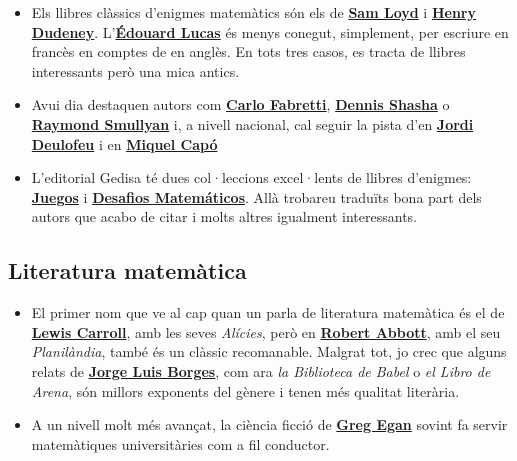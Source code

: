 \documentclass[a4paper, 12pt]{article}
\begin{document}
            \begin{itemize}
                \item Els llibres clàssics d'enigmes matemàtics són els de \href{https://ca.wikipedia.org/wiki/Sam_Loyd}{\textbf{Sam Loyd}} i \href{https://ca.wikipedia.org/wiki/Henry_Dudeney}{\textbf{Henry Dudeney}}. L'\href{https://ca.wikipedia.org/wiki/\%C3\%89douard_Lucas}{\textbf{Édouard Lucas}} és menys conegut, simplement, per escriure en francès en comptes de en anglès. En tots tres casos, es tracta de llibres interessants però una mica antics.
                \item Avui dia destaquen autors com \href{https://es.wikipedia.org/wiki/Carlo_Frabetti}{\textbf{Carlo Fabretti}}, \href{https://en.wikipedia.org/wiki/Dennis_Shasha}{\textbf{Dennis Shasha}} o \href{https://ca.wikipedia.org/wiki/Raymond_Smullyan}{\textbf{Raymond Smullyan}} i, a nivell nacional, cal seguir la pista d'en \href{https://gedisa.com/autor.aspx?codaut=1298}{\textbf{Jordi Deulofeu}} i en \href{https://www.casadellibro.com/libros-ebooks/miquel-capo-dolz/128544}{\textbf{Miquel Capó}}
                \item L'editorial Gedisa té dues col·leccions excel·lents de llibres d'enigmes: \href{https://www.gedisa.com/articulos.aspx?modo=c&fam=040}{\textbf{Juegos}} i \href{https://www.gedisa.com/articulos.aspx?modo=c&fam=1024}{\textbf{Desafios Matemáticos}}. Allà trobareu traduïts bona part dels autors que acabo de citar i molts altres igualment interessants.
            \end{itemize}

        \subsection*{Literatura matemàtica}

            \begin{itemize}
                \item El primer nom que ve al cap quan un parla de literatura matemàtica és el de \href{https://ca.wikipedia.org/wiki/Lewis_Carroll}{\textbf{Lewis Carroll}}, amb les seves \emph{Alícies}, però en \href{https://ca.wikipedia.org/wiki/Edwin_Abbott_Abbott}{\textbf{Robert Abbott}}, amb el seu \emph{Planilàndia}, també és un clàssic recomanable. Malgrat tot, jo crec que alguns relats de \href{https://ca.wikipedia.org/wiki/Jorge_Luis_Borges}{\textbf{Jorge Luis Borges}}, com ara \emph{la Biblioteca de Babel} o \emph{el Libro de Arena}, són millors exponents del gènere i tenen més qualitat literària.
                \item A un nivell molt més avançat, la ciència ficció de \href{https://es.wikipedia.org/wiki/Greg_Egan}{\textbf{Greg Egan}} sovint fa servir matemàtiques universitàries com a fil conductor.
            \end{itemize}
        
\end{document}
